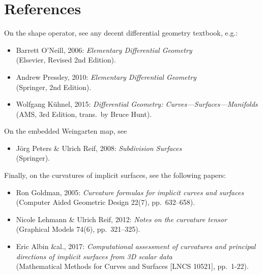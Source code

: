 \documentclass[a4paper]{article}
\begin{document}
\section*{References}
On the shape operator, see any decent differential geometry textbook, e.g.:
\begin{itemize}
\item Barrett O'Neill, 2006:
  \emph{Elementary Differential Geometry}\\
  (Elsevier, Revised 2nd Edition).
\item Andrew Pressley, 2010:
  \emph{Elementary Differential Geometry}\\
  (Springer, 2nd Edition).
\item Wolfgang K\"uhnel, 2015:
  \emph{Differential Geometry: Curves---Surfaces---Manifolds}\\
  (AMS, 3rd Edition, trans.~by Bruce Hunt).
\end{itemize}
On the embedded Weingarten map, see
\begin{itemize}
\item J\"org Peters \& Ulrich Reif, 2008:
  \emph{Subdivision Surfaces}\\
  (Springer).
\end{itemize}
Finally, on the curvatures of implicit surfaces, see the following papers:
\begin{itemize}
\item Ron Goldman, 2005:
  \emph{Curvature formulas for implicit curves and surfaces}\\
  (Computer Aided Geometric Design 22(7), pp.~632--658).
\item Nicole Lehmann \& Ulrich Reif, 2012:
  \emph{Notes on the curvature tensor}\\
  (Graphical Models 74(6), pp.~321--325).
\item Eric Albin \&al., 2017:
  \emph{Computational assessment of curvatures and principal directions of implicit surfaces from 3D scalar data}\\
  (Mathematical Methods for Curves and Surfaces [LNCS 10521], pp.~1-22).
\end{itemize}
\end{document}
